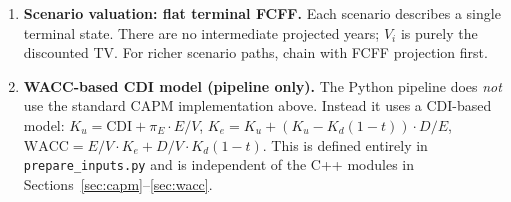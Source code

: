 \documentclass[11pt, a4paper, oneside]{article}
\newcommand{\WACC}{\mathrm{WACC}}
\newcommand{\Ke}{K_e}
\newcommand{\Kd}{K_d}
\newcommand{\Ku}{K_u}
\begin{document}
\begin{enumerate}[leftmargin=*, label=\textbf{\arabic*.}]
\item \textbf{Scenario valuation: flat terminal FCFF.}
  Each scenario describes a single terminal state. There are no
  intermediate projected years; $V_i$ is purely the discounted TV.
  For richer scenario paths, chain with FCFF projection first.

\item \textbf{WACC-based CDI model (pipeline only).}
  The Python pipeline does \emph{not} use the standard CAPM implementation
  above. Instead it uses a CDI-based model:
  $\Ku = \text{CDI} + \pi_E \cdot E/V$,
  $\Ke = \Ku + (\Ku - \Kd(1-t)) \cdot D/E$,
  $\WACC = E/V \cdot \Ke + D/V \cdot \Kd(1-t)$.
  This is defined entirely in \texttt{prepare\_inputs.py} and is independent
  of the C++ modules in Sections~\ref{sec:capm}--\ref{sec:wacc}.

\end{enumerate}
\end{document}
